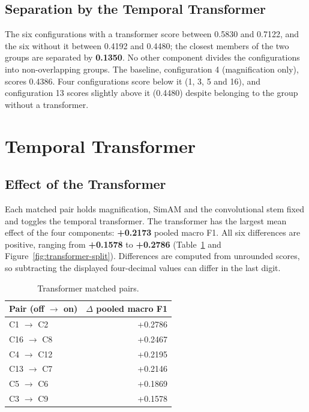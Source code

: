 \subsection{Separation by the Temporal Transformer}
\label{sec:transformer-split}
\label{sec:baseline-count}

The six configurations with a transformer score between 0.5830 and 0.7122, and the six without it between 0.4192 and 0.4480; the closest members of the two groups are separated by \textbf{0.1350}. No other component divides the configurations into non-overlapping groups. The baseline, configuration 4 (magnification only), scores 0.4386. Four configurations score below it (1, 3, 5 and 16), and configuration 13 scores slightly above it (0.4480) despite belonging to the group without a transformer.


\section{Temporal Transformer}
\label{sec:transformer-results}

\subsection{Effect of the Transformer}
\label{sec:transformer-effect}
\label{sec:transformer-six-pairs}

Each matched pair holds magnification, SimAM and the convolutional stem fixed and toggles the temporal transformer. The transformer has the largest mean effect of the four components: \textbf{+0.2173} pooled macro F1. All six differences are positive, ranging from \textbf{+0.1578} to \textbf{+0.2786} (Table~\ref{tab:transformer-pairs} and Figure~\ref{fig:transformer-split}). Differences are computed from unrounded scores, so subtracting the displayed four-decimal values can differ in the last digit.

\begin{table}[htbp]
	\centering
	\begin{tabular}{l r}
		\hline
		\textbf{Pair (off $\rightarrow$ on)} & \textbf{$\Delta$ pooled macro F1} \\
		\hline
		C1 $\rightarrow$ C2  & +0.2786 \\
		C16 $\rightarrow$ C8 & +0.2467 \\
		C4 $\rightarrow$ C12 & +0.2195 \\
		C13 $\rightarrow$ C7 & +0.2146 \\
		C5 $\rightarrow$ C6  & +0.1869 \\
		C3 $\rightarrow$ C9  & +0.1578 \\
		\hline
	\end{tabular}
	\caption[Transformer matched pairs]{Transformer matched pairs.}
	\label{tab:transformer-pairs}
\end{table}

